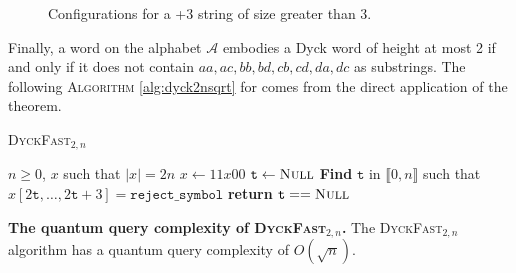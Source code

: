 \begin{tproof}
\begin{figure}[h!]
\begin{minipage}{.60\textwidth}
            \caption{Configurations for a +3 string of size greater than 3.}
            \label{fig:p3string2piece}
        \end{minipage}
    \end{figure}

\end{tproof}
Finally, a word on the alphabet $\mathcal{A}$ embodies a Dyck word of
height at most 2 if and only if it does not contain $aa, ac, bb, bd, cb, cd, da, dc$
as substrings. The following \textsc{Algorithm} \autoref{alg:dyck2nsqrt} for 
comes from the direct application of the theorem.


\begin{algorithm}
    \caption{\textsc{DyckFast}$_{2,n}$}\label{alg:dyck2nsqrt}
    \begin{algorithmic}
        \Require $n \geq 0$, $x$ such that  $|x| = 2n$
        \State $x \gets 11x00$
        \State $\texttt{t} \gets \textsc{Null}$
        \State \textbf{Find} $\texttt{t}$ in $\llbracket0, n\rrbracket$ such that \\
        \hspace*{1cm} $x[2\texttt{t}, \ldots, 2\texttt{t}+3] = \texttt{reject\_symbol}$
        \EndIf
        \EndFor
        \State \textbf{return} $\texttt{t} == \textsc{Null}$

    \end{algorithmic}
\end{algorithm}

\begin{theorem}{\textbf{The quantum query complexity of \textsc{DyckFast}$_{2,n}$.}}
    The \textsc{DyckFast}$_{2,n}$ algorithm has a quantum query complexity of $O\left(\sqrt{n}\right)$.
\end{theorem}

